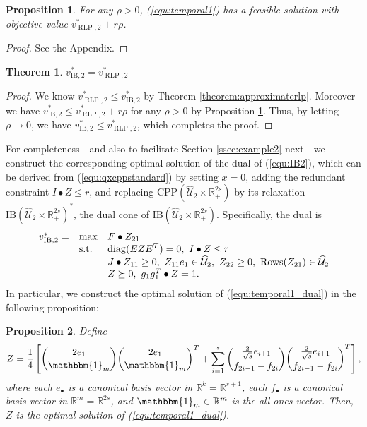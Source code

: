 \documentclass[12pt]{article}
\DeclareMathOperator{\st}{s.t.}
\DeclareMathOperator{\diag}{diag}
\DeclareMathOperator{\AR}{RLP}
\newtheorem{theorem}{Theorem}
\newtheorem{proposition}{Proposition}
\newcommand{\K}{\widehat{\mathcal{U}}}
\newcommand{\CP}{{\mathrm{CPP}}}
\newcommand{\IB}{\mathrm{IB}}
\def\RR{{\mathbb{R}}}
\begin{document}
\begin{onehalfspace}

\begin{proposition} \label{prop:vib2Equalsvar2}
For any $\rho > 0$, (\ref{equ:temporal1})
has a feasible solution with objective value $v_{\AR,2}^* + r
\rho$. 
\end{proposition}

\begin{proof}
See the Appendix.
\end{proof}

\begin{theorem}
$v_{\IB,2}^* = v_{\AR,2}^*$
\end{theorem}

\begin{proof}
We know $v^*_{\AR,2} \le v^*_{\IB,2}$ by Theorem \ref{theorem:approximaterlp}. 
Moreover we have $v_{\IB,2}^* \le v_{\AR,2}^* + r \rho$ for any $\rho >0$
by Proposition \ref{prop:vib2Equalsvar2}. Thus, by letting $\rho \to 0$, we have 
$v_{\IB,2}^* \le v_{\AR,2}^*$, which completes the proof. 
\end{proof}

For completeness---and also to facilitate Section \ref{ssec:example2}
next---we construct the corresponding optimal solution of the dual of
(\ref{equ:IB2}), which can be derived from (\ref{equ:qxcppstandard})
by setting $x = 0$, adding the redundant constraint $I
\bullet Z \le r$, and replacing $\CP(\K_2 \times \RR_+^{2s})$ by its
relaxation $\IB(\K_2 \times \RR_+^{2s})^*$, the dual cone of $\IB(\K_2
\times \RR_+^{2s})$. Specifically, the dual is
%
\begin{equation} \label{equ:temporal1_dual}
\begin{array}{lll}
v_{\IB,2}^* = & \max & F \bullet Z_{21} \\
& \st & \diag(E Z E^T) = 0, \ I \bullet Z \le r  \\
& & J \bullet Z_{11} \ge 0, \ Z_{11}e_1 \in \K_2, \ Z_{22} \ge 0, \
     \text{\rm Rows}(Z_{21}) \in \K_2 \\
& & Z \succeq 0, \ g_1g_1^T \bullet Z = 1.
\end{array}
\end{equation}
In particular, we construct the optimal solution of (\ref{equ:temporal1_dual}) 
in the following proposition:
\begin{proposition} \label{prop:dualoptimal}
Define
\[
Z =
\frac14 \left[
{2e_1 \choose \mathbbm{1}_m} {2e_1 \choose \mathbbm{1}_m}^T
+
\sum_{i=1}^{s}
{\tfrac{2}{\sqrt{s}} e_{i+1} \choose f_{2i-1} - f_{2i} }
{\tfrac{2}{\sqrt{s}} e_{i+1} \choose f_{2i-1} - f_{2i} }^T
\right],
\]
where each $e_{\bullet}$ is a canonical basis vector in $\RR^k = \RR^{s+1}$,
each $f_{\bullet}$ is a canonical basis vector in $\RR^m = \RR^{2s}$, and
$\mathbbm{1}_m \in \RR^m$ is the all-ones vector. Then, $Z$
is the optimal solution of (\ref{equ:temporal1_dual}). 
\end{proposition}


\end{onehalfspace}
\end{document}

